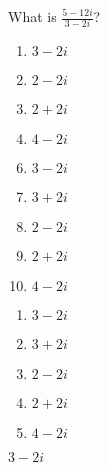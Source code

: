 




 What is $\frac{5-12i}{3-2i}$?


\ifsat
	\begin{enumerate}[label=\Alph*)]
		\item    $3-2i$%
		\item  $2-2i$
		\item   $2+2i$
		\item    $4-2i$
	\end{enumerate}
\else
\fi

\ifacteven
	\begin{enumerate}[label=\textbf{\Alph*.},itemsep=\fill,align=left]
		\setcounter{enumii}{5}
		\item    $3-2i$%
		\item   $3+2i$
		\item  $2-2i$
		\addtocounter{enumii}{1}
		\item   $2+2i$
		\item    $4-2i$
	\end{enumerate}
\else
\fi

\ifactodd
	\begin{enumerate}[label=\textbf{\Alph*.},itemsep=\fill,align=left]
		\item    $3-2i$%
		\item   $3+2i$
		\item  $2-2i$
		\item   $2+2i$
		\item    $4-2i$
	\end{enumerate}
\else
\fi

\ifgridin
    $3-2i$%
		
\else
\fi

